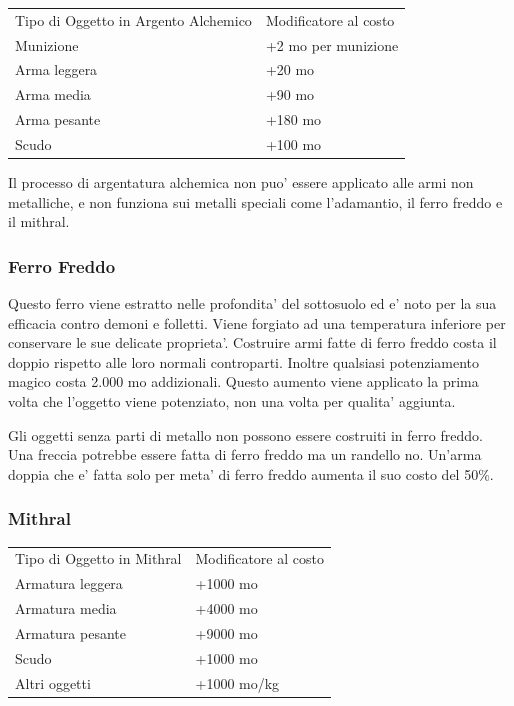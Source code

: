 \documentclass[a4paper,11pt,twoside,openany]{dndbook}
\begin{document}
{\label{argento-alchemico}

\begin{tabular}[c]{@{}ll@{}}
\toprule 
Tipo di Oggetto in Argento Alchemico & Modificatore al costo\tabularnewline
Munizione & +2 mo per munizione\tabularnewline
Arma leggera & +20 mo\tabularnewline
Arma media & +90 mo\tabularnewline
Arma pesante & +180 mo\tabularnewline
Scudo & +100 mo\tabularnewline
\bottomrule
\end{tabular}

Il processo di argentatura alchemica non puo' essere applicato alle armi non metalliche, e non funziona sui metalli speciali come l'adamantio, il ferro freddo e il mithral.

\subsubsection{Ferro Freddo}

\label{ferro-freddo}

Questo ferro viene estratto nelle profondita' del sottosuolo ed e' noto per la sua efficacia contro demoni e folletti. Viene forgiato ad una temperatura inferiore per conservare le sue delicate proprieta'. Costruire armi fatte di ferro freddo costa il doppio rispetto alle loro normali controparti. Inoltre qualsiasi potenziamento magico costa 2.000 mo addizionali. Questo aumento viene applicato la prima volta che l'oggetto viene potenziato, non una volta per qualita' aggiunta. 

Gli oggetti senza parti di metallo non possono essere costruiti in ferro freddo. Una freccia potrebbe essere fatta di ferro freddo ma un randello no. Un'arma doppia che e' fatta solo per meta' di ferro freddo aumenta il suo costo del 50\%.

\subsubsection{Mithral}

\label{mithral}

\begin{tabular}[c]{@{}ll@{}}
\toprule 
Tipo di Oggetto in Mithral & Modificatore al costo\tabularnewline
Armatura leggera & +1000 mo\tabularnewline
Armatura media & +4000 mo\tabularnewline
Armatura pesante & +9000 mo\tabularnewline
Scudo & +1000 mo\tabularnewline
Altri oggetti & +1000 mo/kg\tabularnewline
\bottomrule
\end{tabular}

\bigskip

}
\end{document}
